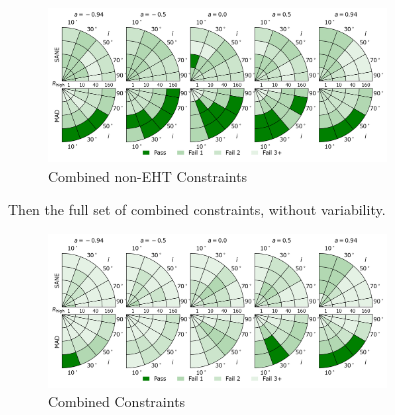 \begin{figure}
  \centering
  \includegraphics[width=0.8\textwidth]{./figures/Non_Interferometric_Constraints.png}
  \caption{Combined non-EHT Constraints}
  \label{fig:noneht_pizza}
\end{figure}

Then the full set of combined constraints, without variability.

\begin{figure}
  \centering
  \includegraphics[width=0.8\textwidth]{./figures/All_Constraints.png}
  \caption{Combined Constraints}
  \label{fig:all_pizza}
\end{figure}

\clearpage










\clearpage
